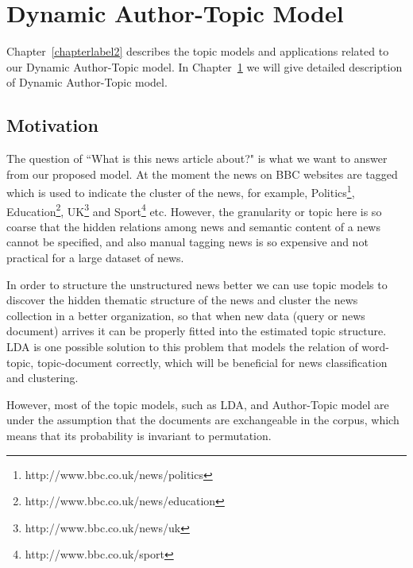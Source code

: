\chapter{Dynamic Author-Topic Model}
\label{chapterlabel3}

Chapter~\ref{chapterlabel2} describes the topic models and applications related to our Dynamic Author-Topic model. In Chapter~\ref{chapterlabel3} we will give detailed description of Dynamic Author-Topic model.

\section{Motivation}

The question of ``What is this news article about?" is what we want to answer from our proposed model. At the moment the news on BBC websites are tagged which is used to indicate the cluster of the news, for example, Politics\footnote{http://www.bbc.co.uk/news/politics}, Education\footnote{http://www.bbc.co.uk/news/education}, UK\footnote{http://www.bbc.co.uk/news/uk} and Sport\footnote{http://www.bbc.co.uk/sport} etc. However, the granularity or topic here is so coarse that the hidden relations among news and semantic content of a news cannot be specified, and also manual tagging news is so expensive and not practical for a large dataset of news. 

In order to structure the unstructured news better we can use topic models to discover the hidden thematic structure of the news and cluster the news collection in a better organization, so that when new data (query or news document) arrives it can be properly fitted into the estimated topic structure. LDA is one possible solution to this problem that models the relation of word-topic, topic-document correctly, which will be beneficial for news classification and clustering. 

However, most of the topic models, such as LDA, and Author-Topic model are under the assumption that the documents are exchangeable in the corpus, which means that its probability is invariant to permutation. 

